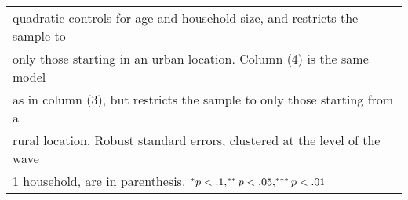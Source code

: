 \begin{table}[htbp]
\begin{tabular}{l*{4}{c}}
\multicolumn{5}{l}{\footnotesize quadratic controls for age and household size, and restricts the sample to}\\
\multicolumn{5}{l}{\footnotesize only those starting in an urban location. Column (4) is the same model}\\
\multicolumn{5}{l}{\footnotesize as in column (3), but restricts the sample to only those starting from a}\\
\multicolumn{5}{l}{\footnotesize rural location. Robust standard errors, clustered at the level of the wave}\\
\multicolumn{5}{l}{\footnotesize 1 household, are in parenthesis. $\sym{*} p<.1, \sym{**}p<.05, \sym{***}p<.01$}\\
\end{tabular}
\end{table}
